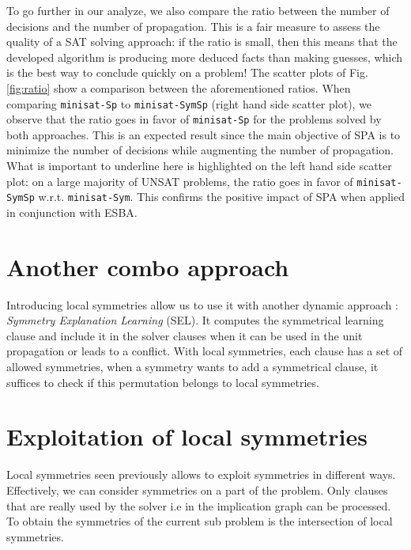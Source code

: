 To go further in our analyze, we also compare the ratio between the number of
decisions and the number of propagation. This is a fair measure to assess the
quality of a SAT solving approach: if the ratio is small, then this means that
the developed algorithm is producing more deduced facts than making guesses,
which is the best way to conclude quickly on a problem!
The scatter plots of Fig.\ref{fig:ratio} show a comparison between the
aforementioned ratios. When comparing \texttt{minisat-Sp} to
\texttt{minisat-SymSp} (right hand side scatter plot), we observe that the
ratio goes in favor of \texttt{minisat-Sp} for the problems solved by both
approaches. This is an expected result since the main objective of SPA is to
minimize the number of decisions while augmenting the number of propagation.
What is important to underline here is highlighted on the left hand side
scatter plot: on a large majority of UNSAT problems, the ratio goes in favor
of \texttt{minisat-SymSp} w.r.t. \texttt{minisat-Sym}. This confirms the
positive impact of SPA when applied in conjunction with ESBA.

\section{Another combo approach}
Introducing local symmetries allow us to use it with another dynamic approach : 
\textit{Symmetry Explanation Learning} (SEL). It computes the symmetrical learning clause and
include it in the solver clauses when it can be used in the unit propagation or leads to a conflict.
With local symmetries, each clause has a set of allowed symmetries, when a symmetry wants to 
add a symmetrical clause, it suffices to check if this permutation belongs to local symmetries.
 
\section{Exploitation of local symmetries}
Local symmetries seen previously allows to exploit symmetries in different ways.
Effectively, we can consider symmetries on a part of the problem. Only clauses that are really used
by the solver i.e in the implication graph can be processed.
To obtain the symmetries of the current sub problem is the intersection of local symmetries.